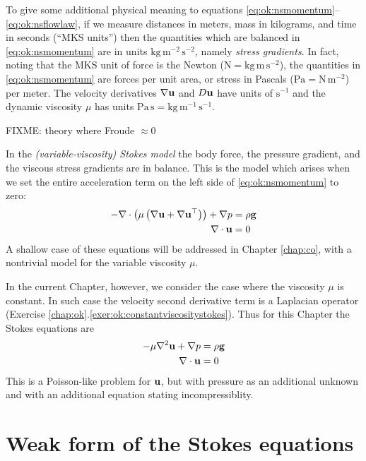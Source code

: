 To give some additional physical meaning to equations \eqref{eq:ok:nsmomentum}--\eqref{eq:ok:nsflowlaw}, if we measure distances in meters, mass in kilograms, and time in seconds (``MKS units'') then the quantities which are balanced in \eqref{eq:ok:nsmomentum} are in units $\text{kg}\, \text{m}^{-2}\, \text{s}^{-2}$, namely \emph{stress gradients}.  In fact, noting that the MKS unit of force is the Newton ($\text{N}=\text{kg}\, \text{m}\, \text{s}^{-2}$), the quantities in \eqref{eq:ok:nsmomentum} are forces per unit area, or stress in Pascals ($\text{Pa} = \text{N}\, \text{m}^{-2}$) per meter.  The velocity derivatives $\nabla \mathbf{u}$ and $D\mathbf{u}$ have units of $\text{s}^{-1}$ and the dynamic viscosity $\mu$ has units $\text{Pa}\, \text{s} = \text{kg}\, \text{m}^{-1}\, \text{s}^{-1}$.

FIXME: theory where Froude $\approx 0$

In the \emph{(variable-viscosity) Stokes model} the body force, the pressure gradient, and the viscous stress gradients are in balance.  This is the model which arises when we set the entire acceleration term on the left side of \eqref{eq:ok:nsmomentum} to zero:
\begin{align}
- \nabla\cdot \left(\mu \left(\nabla \mathbf{u} + \nabla \mathbf{u}^{\top}\right)\right) + \nabla p &= \rho \mathbf{g} \label{eq:ok:varstokesmomentum} \\
\nabla\cdot \mathbf{u} &= 0 \label{eq:ok:varstokesincomp}
\end{align}
A shallow case of these equations will be addressed in Chapter \ref{chap:co}, with a nontrivial model for the variable viscosity $\mu$.

In the current Chapter, however, we consider the case where the viscosity $\mu$ is constant.  In such case the velocity second derivative term is a Laplacian operator (Exercise \ref{chap:ok}.\ref{exer:ok:constantviscositystokes}).  Thus for this Chapter the Stokes equations are
\begin{align}
- \mu \nabla^2 \mathbf{u} + \nabla p &= \rho \mathbf{g}  \label{eq:ok:constantviscositystokes} \\
\nabla\cdot \mathbf{u} &= 0  \label{eq:ok:constantviscosityincomp}
\end{align}
This is a Poisson-like problem for $\mathbf{u}$, but with pressure as an additional unknown and with an additional equation stating incompressiblity.


\section{Weak form of the Stokes equations}

